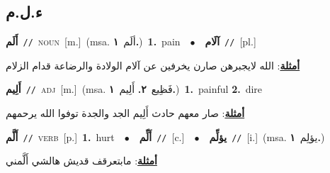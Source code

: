\documentclass[10pt,a4paper,twoside]{article} %
\begin{document}
\begin{multicols}{2}
\vspace{-3mm}
\subsection*{\color{blue}\foreignlanguage{arabic}{ء.ل.م}\color{blue}{}} 

{\setlength\topsep{0pt}\textbf{\foreignlanguage{arabic}{أَلَم}}\ {\color{gray}\texttt{//}\color{black}}\ \textsc{noun}\ [m.]\ \color{gray}(msa. \foreignlanguage{arabic}{ألَم}~\foreignlanguage{arabic}{\textbf{١.}})\color{black}\ \textbf{1.}~pain\ \ $\bullet$\ \ \setlength\topsep{0pt}\textbf{\foreignlanguage{arabic}{آلَام}}\ {\color{gray}\texttt{//}\color{black}}\ [pl.]\  \begin{flushright}\color{gray}\foreignlanguage{arabic}{\textbf{\underline{\foreignlanguage{arabic}{أمثلة}}}: الله لايجبرهن صارن يخرفين عن آلام الولادة والرضاعة قدام الزلام}\end{flushright}\color{black}} \vspace{2mm}

{\setlength\topsep{0pt}\textbf{\foreignlanguage{arabic}{أَلِيم}}\ {\color{gray}\texttt{//}\color{black}}\ \textsc{adj}\ [m.]\ \color{gray}(msa. \foreignlanguage{arabic}{فَظِيع}~\foreignlanguage{arabic}{\textbf{٢.}}  \foreignlanguage{arabic}{أَلِيم}~\foreignlanguage{arabic}{\textbf{١.}})\color{black}\ \textbf{1.}~painful  \textbf{2.}~dire\  \begin{flushright}\color{gray}\foreignlanguage{arabic}{\textbf{\underline{\foreignlanguage{arabic}{أمثلة}}}: صار معهم حادث أَلِيم الجد والجدة توفوا الله يرحمهم}\end{flushright}\color{black}} \vspace{2mm}

{\setlength\topsep{0pt}\textbf{\foreignlanguage{arabic}{أَلَّم}}\ {\color{gray}\texttt{//}\color{black}}\ \textsc{verb}\ [p.]\ \textbf{1.}~hurt\ \ $\bullet$\ \ \setlength\topsep{0pt}\textbf{\foreignlanguage{arabic}{أَلِّم}}\ {\color{gray}\texttt{//}\color{black}}\ [c.]\ \ $\bullet$\ \ \setlength\topsep{0pt}\textbf{\foreignlanguage{arabic}{يؤلِّم}}\ {\color{gray}\texttt{//}\color{black}}\ [i.]\ \color{gray}(msa. \foreignlanguage{arabic}{يؤلِم}~\foreignlanguage{arabic}{\textbf{١.}})\color{black}\  \begin{flushright}\color{gray}\foreignlanguage{arabic}{\textbf{\underline{\foreignlanguage{arabic}{أمثلة}}}: مابتعرقف قديش هالشي أَلَّمني}\end{flushright}\color{black}} \vspace{2mm}


\end{multicols}
\end{document}
